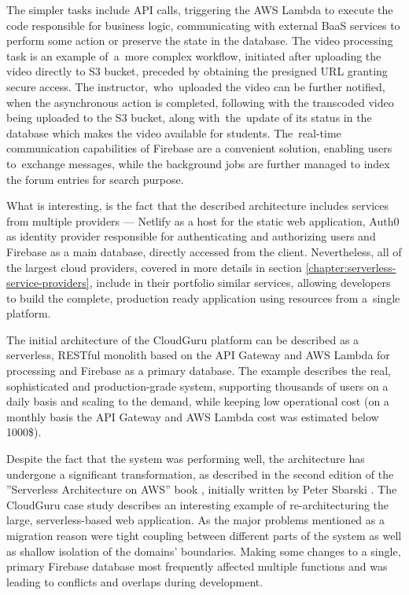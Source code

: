 The simpler tasks include API calls, triggering the AWS Lambda to execute the code responsible for business logic, communicating with external BaaS services to perform some action or preserve the state in the database.
The video processing task is an example of~a~more complex workflow, initiated after uploading the video directly to S3 bucket, preceded by obtaining the presigned URL granting secure access.
The instructor,~who~uploaded the video can be further notified, when the asynchronous action is completed, following with the transcoded video being uploaded to the S3 bucket, along with~the~update of its status in the database which makes the video available for students.
The~real-time communication capabilities of Firebase are a convenient solution, enabling users to~exchange messages, while the background jobs are further managed to index the forum entries for search purpose.

What is interesting, is the fact that the described architecture includes services from multiple providers --- Netlify as a host for the static web application, Auth0 as identity provider responsible for authenticating and authorizing users and Firebase as a main database, directly accessed from the client. Nevertheless, all of the largest cloud providers, covered in more details in section \ref{chapter:serverless-service-providers}, include in their portfolio similar services, allowing developers to build the complete, production ready application using resources from a~single platform.

The initial architecture of the CloudGuru platform can be described as a serverless, RESTful monolith based on the API Gateway and AWS Lambda for processing and Firebase as a primary database.
The example describes the real, sophisticated and production-grade system, supporting thousands of users on a daily basis and scaling to the demand, while keeping low operational cost (on a monthly basis the API Gateway and AWS Lambda cost was estimated below 1000\$).

Despite the fact that the system was performing well, the architecture has undergone a significant transformation, as described in the second edition of the ''Serverless Architecture on AWS'' book \cite{ServerlessArchitectureOnAWSSecondEdition}, initially written by Peter Sbarski \cite{ServerlessArchitectureOnAWS}.
The CloudGuru case study describes an interesting example of re-architecturing the large, serverless-based web application.
As the major problems mentioned as a migration reason were tight coupling between different parts of the system as well as shallow isolation of the domains' boundaries.
Making some changes to a single, primary Firebase database most frequently affected multiple functions and was leading to conflicts and overlaps during development.

